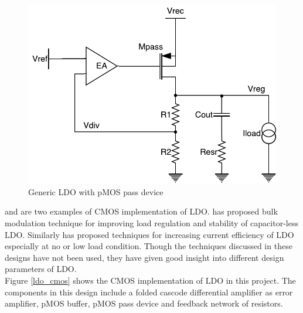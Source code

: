 \documentclass[12pt,a4paper,UKenglish]{article}
\begin{document}
\begin{figure}[htbp] %
   \centering
   \includegraphics[width=.9\textwidth]{img/ldo.pdf} 
   \caption{Generic LDO with pMOS pass device}
   \label{ldo_gen}
\end{figure}

\cite{ldo_bulkmod} and \cite{ldo_quiescent} are two examples of CMOS implementation of LDO. \cite{ldo_bulkmod} has proposed bulk modulation technique for improving load regulation and stability of capacitor-less LDO. Similarly \cite{ldo_quiescent} has  proposed techniques for increasing current efficiency of LDO especially at no or low load condition. Though the techniques discussed in these designs have not been used, they have given good insight into different design parameters of LDO.  \\

Figure \ref{ldo_cmos} shows the CMOS implementation of LDO in this project. The components in this design include a folded cascode differential amplifier as error amplifier, pMOS buffer, pMOS pass device and feedback network of resistors. 
\end{document}
